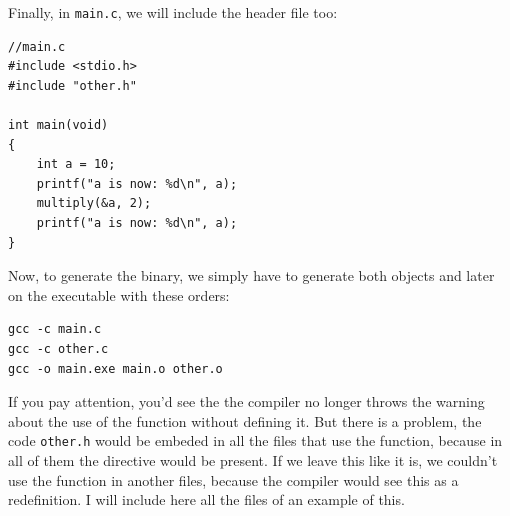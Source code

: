 \documentclass[a4paper]{article}
\begin{document}
Finally, in \verb!main.c!, we will include the header file too:

\noindent
\begin{minipage}[H]{\linewidth}
\mbox{}
\begin{lstlisting}[style=C,
caption={Main file with included headers},
label={lst:fileCofHeader}]
//main.c
#include <stdio.h>
#include "other.h"

int main(void)
{
    int a = 10;
    printf("a is now: %d\n", a);
    multiply(&a, 2);
    printf("a is now: %d\n", a);
}
\end{lstlisting}
\end{minipage}

Now, to generate the binary, we simply have to generate both objects and later
on the executable with these orders:

\noindent
\begin{minipage}[H]{\linewidth}
\mbox{}
\begin{lstlisting}[style=terminalStyle]
gcc -c main.c
gcc -c other.c
gcc -o main.exe main.o other.o
\end{lstlisting}
\end{minipage}

If you pay attention, you'd see the the compiler no longer throws the warning
about the use of the function without defining it. But there is a problem, the
code \verb!other.h! would be embeded in all the files that use the function,
because in all of them the directive would be present. If we leave this like
it is, we couldn't use the function in another files, because the compiler would
see this as a redefinition. I will include here all the files of an example of
this.
\end{document}
